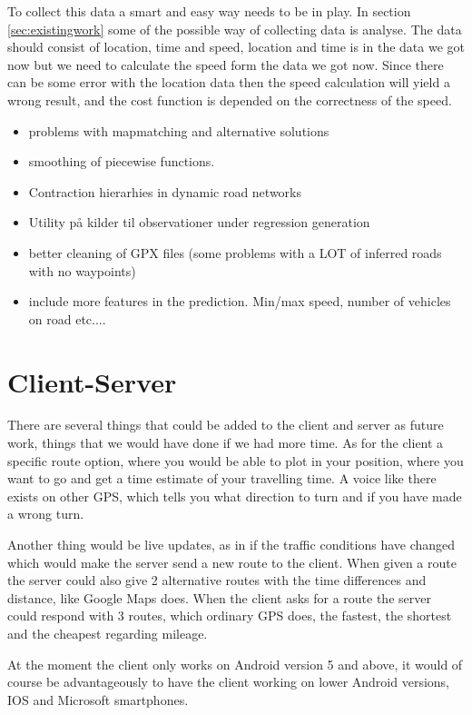To collect this data a smart and easy way needs to be in play. In section \ref{sec:existingwork} some of the possible way of collecting data is analyse. The data should consist of location, time and speed, location and time is in the data we got now but we need to calculate the speed form the data we got now. Since there can be some error with the location data then the speed calculation will yield a wrong result, and the cost function is depended on the correctness of the speed.

\begin{itemize}
	\item problems with mapmatching and alternative solutions
	\item smoothing of piecewise functions.
	\item Contraction hierarhies in dynamic road networks
	\item Utility på kilder til observationer under regression generation
	\item better cleaning of GPX files (some problems with a LOT of inferred roads with no waypoints)
	\item include more features in the prediction. Min/max speed, number of vehicles on road etc....
\end{itemize}

\section{Client-Server}
There are several things that could be added to the client and server as future work, things that we would have done if we had more time. 
As for the client a specific route option, where you would be able to plot in your position, where you want to go and get a time estimate of your travelling time. A voice like there exists on other GPS, which tells you what direction to turn and if you have made a wrong turn.

Another thing would be live updates, as in if the traffic conditions have changed which would make the server send a new route to the client. When given a route the server could also give 2 alternative routes with the time differences and distance, like Google Maps does. 
When the client asks for a route the server could respond with 3 routes, which ordinary GPS does, the fastest, the shortest and the cheapest regarding  mileage.

At the moment the client only works on Android version 5 and above, it would of course be advantageously to have the client working on lower Android versions, IOS and Microsoft smartphones.